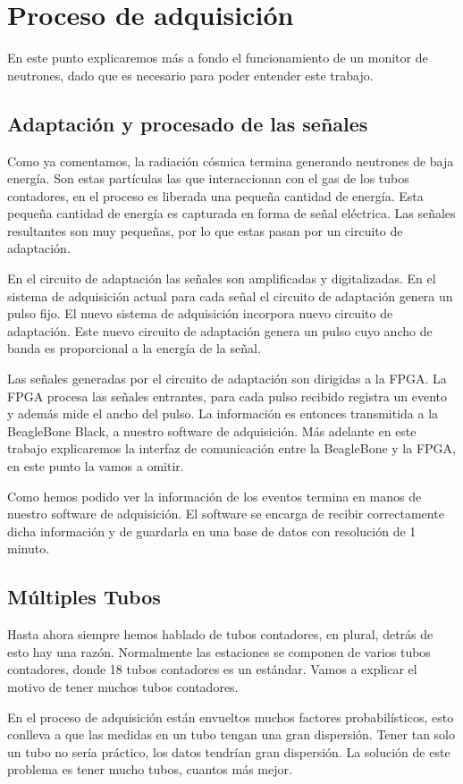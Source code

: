 \section{Proceso de adquisición}
	En este punto explicaremos más a fondo el funcionamiento de un monitor de neutrones, dado que es necesario para poder entender este trabajo.
	\subsection{Adaptación y procesado de las señales}
		Como ya comentamos, la radiación cósmica termina generando neutrones de baja energía. Son estas partículas las que interaccionan con
		el gas de los tubos contadores, en el proceso es liberada una pequeña cantidad de energía. Esta pequeña cantidad de energía es
		capturada en forma de señal eléctrica. Las señales resultantes son muy pequeñas, por lo que estas pasan por un circuito de adaptación. 
		\par
		En el circuito de adaptación las señales son amplificadas y digitalizadas. En el sistema de adquisición actual para cada señal el
		circuito de adaptación genera un pulso fijo. El nuevo sistema de adquisición incorpora nuevo circuito de adaptación. Este nuevo
		circuito de adaptación genera un pulso cuyo ancho de banda es proporcional a la energía de la señal. 
		\par
		Las señales generadas por el circuito de adaptación son dirigidas a la FPGA. La FPGA procesa las señales entrantes, para cada pulso
		recibido registra un evento y además mide el ancho del pulso. La información es entonces transmitida a la BeagleBone Black, a nuestro
		software de adquisición. Más adelante en este trabajo explicaremos la interfaz de comunicación entre la BeagleBone y la FPGA, en este
		punto la vamos a omitir. 
		\par
		Como hemos podido ver la información de los eventos termina en manos de nuestro software de adquisición. El software se encarga de
		recibir correctamente dicha información y de guardarla en una base de datos con resolución de 1 minuto.
	\subsection{Múltiples Tubos}
		Hasta ahora siempre hemos hablado de tubos contadores, en plural, detrás de esto hay una razón. Normalmente las estaciones se componen
		de varios tubos contadores, donde 18 tubos contadores es un estándar. Vamos a explicar el motivo de tener muchos tubos contadores. 
		\par
		En el proceso de adquisición están envueltos muchos factores probabilísticos, esto conlleva a que las medidas en un tubo tengan una
		gran dispersión. Tener tan solo un tubo no sería práctico, los datos tendrían gran dispersión. La solución de este problema es tener
		mucho tubos, cuantos más mejor.
